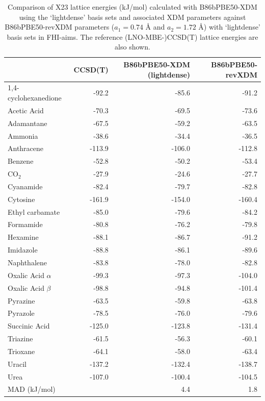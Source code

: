 \begin{table}[h]

\caption{\label{tab:x23_xdm_compare}Comparison of X23 lattice energies (kJ/mol) calculated with B86bPBE50-XDM using the `lightdense' basis sets and associated XDM parameters against B86bPBE50-revXDM parameters ($a_1 = 0.74$ \AA{} and $a_2 = 1.72$ \AA{}) with `lightdense' basis sets in FHI-aims. The reference (LNO-MBE-)CCSD(T) lattice energies are also shown.}
\begin{tabular}{lrrr}
\toprule
 & CCSD(T) & B86bPBE50-XDM (lightdense) & B86bPBE50-revXDM \\ 
\midrule
1,4-cyclohexanedione & -92.2 & -85.6 & -91.2 \\
Acetic Acid & -70.3 & -69.5 & -73.6 \\
Adamantane & -67.5 & -59.2 & -63.5 \\
Ammonia & -38.6 & -34.4 & -36.5 \\
Anthracene & -113.9 & -106.0 & -112.8 \\
Benzene & -52.8 & -50.2 & -53.4 \\
CO$_2$ & -27.9 & -24.6 & -27.7 \\
Cyanamide & -82.4 & -79.7 & -82.8 \\
Cytosine & -161.9 & -154.0 & -160.4 \\
Ethyl carbamate & -85.0 & -79.6 & -84.2 \\
Formamide & -80.8 & -76.2 & -79.8 \\
Hexamine & -88.1 & -86.7 & -91.2 \\
Imidazole & -88.8 & -86.1 & -89.6 \\
Naphthalene & -83.8 & -78.0 & -82.8 \\
Oxalic Acid $\alpha$ & -99.3 & -97.3 & -104.0 \\
Oxalic Acid $\beta$ & -98.8 & -94.8 & -101.4 \\
Pyrazine & -63.5 & -59.8 & -63.8 \\
Pyrazole & -78.5 & -76.0 & -79.6 \\
Succinic Acid & -125.0 & -123.8 & -131.4 \\
Triazine & -61.5 & -56.3 & -60.1 \\
Trioxane & -64.1 & -58.0 & -63.4 \\
Uracil & -137.2 & -132.4 & -138.7 \\
Urea & -107.0 & -100.4 & -104.5 \\
MAD (kJ/mol) &  & 4.4 & 1.8 \\
\bottomrule
\end{tabular}

\end{table}